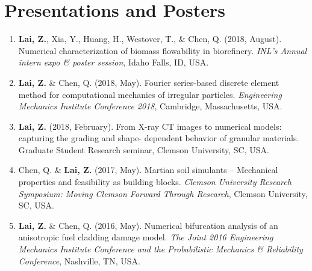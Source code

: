 \documentclass[11pt,]{elsarticle}
\providecommand{\tightlist}{%
  \setlength{\itemsep}{0pt}\setlength{\parskip}{0pt}}
\begin{document}
\hypertarget{presentations-and-posters}{%
\section{Presentations and Posters}\label{presentations-and-posters}}

\begin{enumerate}
\def\labelenumi{\arabic{enumi}.}
\tightlist
\item
  \textbf{Lai, Z.}, Xia, Y., Huang, H., Westover, T., \& Chen, Q. (2018,
  August). Numerical characterization of biomass flowability in
  biorefinery. \emph{INL's Annual intern expo \& poster session}, Idaho
  Falls, ID, USA.
\item
  \textbf{Lai, Z.} \& Chen, Q. (2018, May). Fourier series-based
  discrete element method for computational mechanics of irregular
  particles. \emph{Engineering Mechanics Institute Conference 2018},
  Cambridge, Massachusetts, USA.
\item
  \textbf{Lai, Z.} (2018, February). From X-ray CT images to numerical
  models: capturing the grading and shape- dependent behavior of
  granular materials. Graduate Student Research seminar, Clemson
  University, SC, USA.
\item
  Chen, Q. \& \textbf{Lai, Z.} (2017, May). Martian soil simulants --
  Mechanical properties and feasibility as building blocks.
  \emph{Clemson University Research Symposium: Moving Clemson Forward
  Through Research}, Clemson University, SC, USA.
\item
  \textbf{Lai, Z.} \& Chen, Q. (2016, May). Numerical bifurcation
  analysis of an anisotropic fuel cladding damage model. \emph{The Joint
  2016 Engineering Mechanics Institute Conference and the Probabilistic
  Mechanics \& Reliability Conference}, Nashville, TN, USA.
\end{enumerate}
\end{document}
